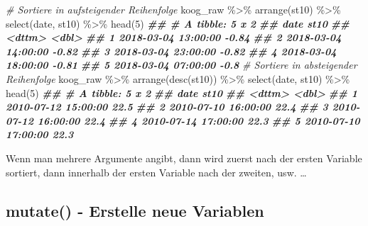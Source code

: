 \documentclass[
]{article}
\newenvironment{Shaded}{\begin{snugshade}}{\end{snugshade}}
\newcommand{\CommentTok}[1]{\textcolor[rgb]{0.56,0.35,0.01}{\textit{#1}}}
\newcommand{\DecValTok}[1]{\textcolor[rgb]{0.00,0.00,0.81}{#1}}
\newcommand{\DocumentationTok}[1]{\textcolor[rgb]{0.56,0.35,0.01}{\textbf{\textit{#1}}}}
\newcommand{\FunctionTok}[1]{\textcolor[rgb]{0.00,0.00,0.00}{#1}}
\newcommand{\NormalTok}[1]{#1}
\newcommand{\SpecialCharTok}[1]{\textcolor[rgb]{0.00,0.00,0.00}{#1}}
\begin{document}
\begin{Shaded}
\begin{Highlighting}[]
\CommentTok{\# Sortiere in aufsteigender Reihenfolge}
\NormalTok{koog\_raw }\SpecialCharTok{\%\textgreater{}\%}
  \FunctionTok{arrange}\NormalTok{(st10) }\SpecialCharTok{\%\textgreater{}\%}
  \FunctionTok{select}\NormalTok{(date, st10) }\SpecialCharTok{\%\textgreater{}\%}
  \FunctionTok{head}\NormalTok{(}\DecValTok{5}\NormalTok{)}
\DocumentationTok{\#\# \# A tibble: 5 x 2}
\DocumentationTok{\#\#   date                 st10}
\DocumentationTok{\#\#   \textless{}dttm\textgreater{}              \textless{}dbl\textgreater{}}
\DocumentationTok{\#\# 1 2018{-}03{-}04 13:00:00 {-}0.84}
\DocumentationTok{\#\# 2 2018{-}03{-}04 14:00:00 {-}0.82}
\DocumentationTok{\#\# 3 2018{-}03{-}04 23:00:00 {-}0.82}
\DocumentationTok{\#\# 4 2018{-}03{-}04 18:00:00 {-}0.81}
\DocumentationTok{\#\# 5 2018{-}03{-}04 07:00:00 {-}0.8}
\CommentTok{\# Sortiere in absteigender Reihenfolge}
\NormalTok{koog\_raw }\SpecialCharTok{\%\textgreater{}\%}
  \FunctionTok{arrange}\NormalTok{(}\FunctionTok{desc}\NormalTok{(st10)) }\SpecialCharTok{\%\textgreater{}\%}
  \FunctionTok{select}\NormalTok{(date, st10) }\SpecialCharTok{\%\textgreater{}\%}
  \FunctionTok{head}\NormalTok{(}\DecValTok{5}\NormalTok{)}
\DocumentationTok{\#\# \# A tibble: 5 x 2}
\DocumentationTok{\#\#   date                 st10}
\DocumentationTok{\#\#   \textless{}dttm\textgreater{}              \textless{}dbl\textgreater{}}
\DocumentationTok{\#\# 1 2010{-}07{-}12 15:00:00  22.5}
\DocumentationTok{\#\# 2 2010{-}07{-}10 16:00:00  22.4}
\DocumentationTok{\#\# 3 2010{-}07{-}12 16:00:00  22.4}
\DocumentationTok{\#\# 4 2010{-}07{-}14 17:00:00  22.3}
\DocumentationTok{\#\# 5 2010{-}07{-}10 17:00:00  22.3}
\end{Highlighting}
\end{Shaded}

Wenn man mehrere Argumente angibt, dann wird zuerst nach der ersten Variable sortiert, dann innerhalb der ersten Variable nach der zweiten, usw. \ldots{}

\hypertarget{mutate---erstelle-neue-variablen}{%
\subsection{mutate() - Erstelle neue Variablen}\label{mutate---erstelle-neue-variablen}}
\end{document}
